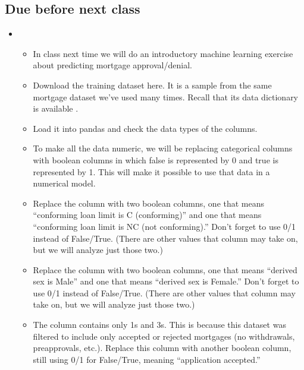 \documentclass[letterpaper,10pt,english]{sphinxmanual}
\begin{document}
\subsection{Due before next class}
\label{\detokenize{course-schedule:id20}}\begin{itemize}
\item {} 
\begin{itemize}
\item {} 
In class next time we will do an introductory machine learning exercise about predicting mortgage approval/denial.

\item {} 
Download the training dataset here.  It is a sample from the same mortgage dataset we’ve used many times.  Recall that its data dictionary is available .

\item {} 
Load it into pandas and check the data types of the columns.

\item {} 
To make all the data numeric, we will be replacing categorical columns with boolean columns in which false is represented by 0 and true is represented by 1.  This will make it possible to use that data in a numerical model.

\item {} 
Replace the  column with two boolean columns, one that means “conforming loan limit is C (conforming)” and one that means “conforming loan limit is NC (not conforming).”  Don’t forget to use 0/1 instead of False/True.  (There are other values that column may take on, but we will analyze just those two.)

\item {} 
Replace the  column with two boolean columns, one that means “derived sex is Male” and one that means “derived sex is Female.”  Don’t forget to use 0/1 instead of False/True.  (There are other values that column may take on, but we will analyze just those two.)

\item {} 
The  column contains only 1s and 3s.  This is because this dataset was filtered to include only accepted or rejected mortgages (no withdrawals, pre\sphinxhyphen{}approvals, etc.).  Replace this column with another boolean column, still using 0/1 for False/True, meaning “application accepted.”


\end{itemize}
\end{itemize}
\end{document}

